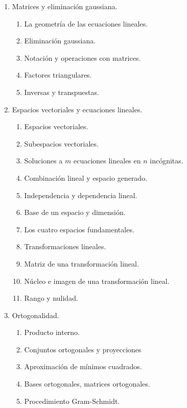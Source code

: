 \documentclass[8pt]{article}
\begin{document}
\begin{multicols}{2}
    \begin{enumerate}
        \item Matrices y eliminación gaussiana.
        \begin{enumerate}
            \item La geometría de las ecuaciones lineales.
            \item Eliminación gaussiana.
            \item Notación y operaciones con matrices.
            \item Factores triangulares.
            \item Inversas y transpuestas.
        \end{enumerate}
        \item Espacios vectoriales y ecuaciones lineales.
        \begin{enumerate}
            \item Espacios vectoriales.
            \item Subespacios vectoriales.
            \item Soluciones a $m$ ecuaciones lineales en $n$ incógnitas.
            \item Combinación lineal y espacio generado.
            \item Independencia y dependencia lineal.
            \item Base de un espacio y dimensión.
            \item Los cuatro espacios fundamentales.
            \item Transformaciones lineales.
            \item Matriz de una transformación lineal.
            \item Núcleo e imagen de una transformación lineal.
            \item Rango y nulidad.
        \end{enumerate}
        \item Ortogonalidad.
        \begin{enumerate}
            \item Producto interno.
            \item Conjuntos ortogonales y proyecciones  
            \item Aproximación de mínimos cuadrados. 
            \item Bases ortogonales, matrices ortogonales. 
            \item Procedimiento Gram-Schmidt.

\end{enumerate}
\end{enumerate}
\end{multicols}
\end{document}
